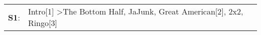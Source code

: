 \begin{supertabular}{p{0.03\textwidth}p{0.92\textwidth}}
 \textbf{S1}:  &  Intro[1]\textsuperscript{} \textgreater \enspace The Bottom Half\textsuperscript{}, \enspace JaJunk\textsuperscript{}, \enspace Great American[2]\textsuperscript{}, \enspace 2x2\textsuperscript{}, \enspace Ringo[3]\textsuperscript{}  \enspace  \\
\end{supertabular}
